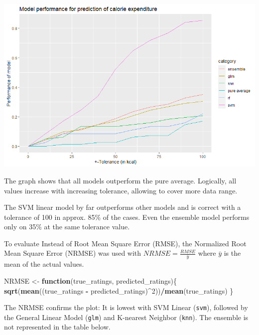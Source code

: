 \documentclass[
]{article}
\newenvironment{Shaded}{\begin{snugshade}}{\end{snugshade}}
\newcommand{\ControlFlowTok}[1]{\textcolor[rgb]{0.13,0.29,0.53}{\textbf{#1}}}
\newcommand{\DecValTok}[1]{\textcolor[rgb]{0.00,0.00,0.81}{#1}}
\newcommand{\KeywordTok}[1]{\textcolor[rgb]{0.13,0.29,0.53}{\textbf{#1}}}
\newcommand{\NormalTok}[1]{#1}
\newcommand{\OperatorTok}[1]{\textcolor[rgb]{0.81,0.36,0.00}{\textbf{#1}}}
\newcommand{\StringTok}[1]{\textcolor[rgb]{0.31,0.60,0.02}{#1}}
\begin{document}
\includegraphics{./0b26bbe97576aac768e331f7c2dde9223408a268.png}

The graph shows that all models outperform the pure average. Logically,
all values increase with increasing tolerance, allowing to cover more
data range.

The SVM linear model by far outperforms other models and is correct with
a tolerance of 100 in approx. 85\% of the cases. Even the ensemble model
performs only on 35\% at the same tolerance value.

To evaluate Instead of Root Mean Square Error (RMSE), the Normalized
Root Mean Square Error (NRMSE) was used with
\(NRMSE=\frac{RMSE}{\bar{y}}\) where \(\bar{y}\) is the mean of the
actual values.

\begin{Shaded}
\begin{Highlighting}[]
\NormalTok{NRMSE <-}\StringTok{ }\ControlFlowTok{function}\NormalTok{(true_ratings, predicted_ratings)\{}
  \KeywordTok{sqrt}\NormalTok{(}\KeywordTok{mean}\NormalTok{((true_ratings }\OperatorTok{-}\StringTok{ }\NormalTok{predicted_ratings)}\OperatorTok{^}\DecValTok{2}\NormalTok{))}\OperatorTok{/}\KeywordTok{mean}\NormalTok{(true_ratings)}
\NormalTok{\}}
\end{Highlighting}
\end{Shaded}

The NRMSE confirms the plot: It is lowest with SVM Linear
(\texttt{svm}), followed by the General Linear Model (\texttt{glm}) and
K-nearest Neighbor (\texttt{knn}). The ensemble is not represented in
the table below.
\end{document}
